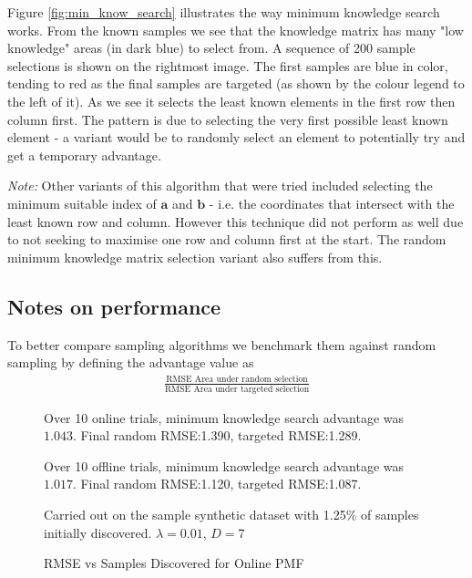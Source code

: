Figure \ref{fig:min_know_search} illustrates the way minimum knowledge search works. From the known samples we see that the knowledge matrix has many "low knowledge" areas (in dark blue) to select from. A sequence of 200 sample selections is shown on the rightmost image. The first samples are blue in color, tending to red as the final samples are targeted (as shown by the colour legend to the left of it). As we see it selects the least known elements in the first row then column first. The pattern is due to selecting the very first possible least known element - a variant would be to randomly select an element to potentially try and get a temporary advantage.

\textit{Note:} Other variants of this algorithm that were tried included selecting the minimum suitable index of $\mathbf{a}$ and $\mathbf{b}$ - i.e. the coordinates that intersect with the least known row and column. However this technique did not perform as well due to not seeking to maximise one row and column first at the start. The random minimum knowledge matrix selection variant also suffers from this.


\subsection{Notes on performance}

To better compare sampling algorithms we benchmark them against random sampling by defining the advantage value as 
\begin{align*}
\frac{\text{RMSE Area under random selection}}{\text{RMSE Area under targeted selection}}
\end{align*}


\begin{figure}[!htbp]
  \begin{center}
    \resizebox{\textwidth}{!}{}
  \end{center}
  Over 10 online trials, minimum knowledge search advantage was $1.043$. Final random RMSE:1.390, targeted RMSE:1.289.
  
   Over 10 offline trials, minimum knowledge search advantage was $1.017$. Final random RMSE:1.120, targeted RMSE:1.087. 
    
Carried out on the sample synthetic dataset with 1.25\% of samples initially discovered.  $\lambda = 0.01$, $D=7$
    \caption{RMSE vs Samples Discovered for Online PMF}
    \label{fig:online_pmf_active}
\end{figure}


